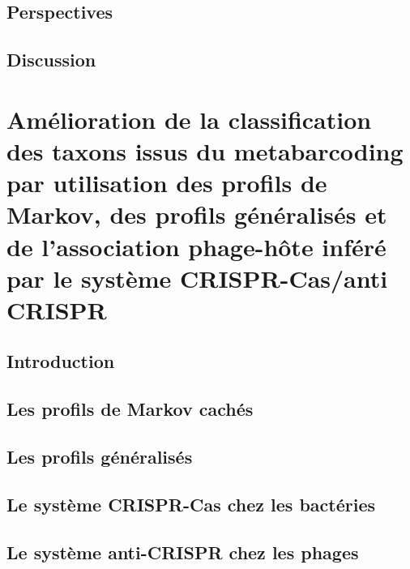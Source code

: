 \documentclass[12pt,twoside]{reedthesis}
\begin{document}
\hypertarget{perspectives}{%
\section{Perspectives}\label{perspectives}}

\hypertarget{discussion}{%
\section{Discussion}\label{discussion}}

\hypertarget{classif}{%
\chapter{Amélioration de la classification des taxons issus du metabarcoding par utilisation des profils de Markov, des profils généralisés et de l'association phage-hôte inféré par le système CRISPR-Cas/anti CRISPR}\label{classif}}

\hypertarget{introduction-2}{%
\section{Introduction}\label{introduction-2}}

\hypertarget{les-profils-de-markov-cachuxe9s}{%
\section{Les profils de Markov cachés}\label{les-profils-de-markov-cachuxe9s}}

\hypertarget{les-profils-guxe9nuxe9ralisuxe9s}{%
\section{Les profils généralisés}\label{les-profils-guxe9nuxe9ralisuxe9s}}

\hypertarget{le-systuxe8me-crispr-cas-chez-les-bactuxe9ries}{%
\section{Le système CRISPR-Cas chez les bactéries}\label{le-systuxe8me-crispr-cas-chez-les-bactuxe9ries}}

\hypertarget{le-systuxe8me-anti-crispr-chez-les-phages}{%
\section{Le système anti-CRISPR chez les phages}\label{le-systuxe8me-anti-crispr-chez-les-phages}}
\end{document}
